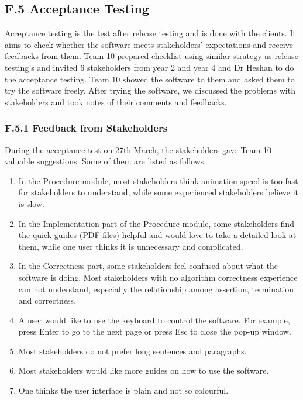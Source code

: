 \documentclass[
]{article}
\begin{document}
\hypertarget{header-n185}{%
\subsection{F.5 Acceptance Testing}\label{header-n185}}

Acceptance testing is the test after release testing and is done with
the clients. It aims to check whether the software meets stakeholders'
expectations and receive feedbacks from them. Team 10 prepared checklist
using similar strategy as release testing's and invited 6 stakeholders
from year 2 and year 4 and Dr Heshan to do the acceptance testing. Team
10 showed the software to them and asked them to try the software
freely. After trying the software, we discussed the problems with
stakeholders and took notes of their comments and feedbacks.

\hypertarget{header-n187}{%
\subsubsection{F.5.1 Feedback from Stakeholders}\label{header-n187}}

During the acceptance test on 27th March, the stakeholders gave Team 10
valuable suggestions. Some of them are listed as follows.

\begin{enumerate}
\def\labelenumi{\arabic{enumi}.}
\item
  In the Procedure module, most stakeholders think animation speed is
  too fast for stakeholders to understand, while some experienced
  stakeholders believe it is slow.
\item
  In the Implementation part of the Procedure module, some stakeholders
  find the quick guides (PDF files) helpful and would love to take a
  detailed look at them, while one user thinks it is unnecessary and
  complicated.
\item
  In the Correctness part, some stakeholders feel confused about what
  the software is doing. Most stakeholders with no algorithm correctness
  experience can not understand, especially the relationship among
  assertion, termination and correctness.
\item
  A user would like to use the keyboard to control the software. For
  example, press Enter to go to the next page or press Esc to close the
  pop-up window.
\item
  Most stakeholders do not prefer long sentences and paragraphs.
\item
  Most stakeholders would like more guides on how to use the software.
\item
  One thinks the user interface is plain and not so colourful.
\end{enumerate}
\end{document}
